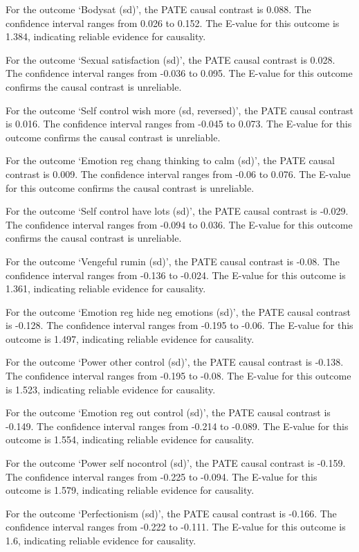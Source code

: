 \documentclass[
  singlecolumn]{report}
\begin{document}
For the outcome `Bodysat (sd)', the PATE causal contrast is 0.088. The
confidence interval ranges from 0.026 to 0.152. The E-value for this
outcome is 1.384, indicating reliable evidence for causality.

For the outcome `Sexual satisfaction (sd)', the PATE causal contrast is
0.028. The confidence interval ranges from -0.036 to 0.095. The E-value
for this outcome confirms the causal contrast is unreliable.

For the outcome `Self control wish more (sd, reversed)', the PATE causal
contrast is 0.016. The confidence interval ranges from -0.045 to 0.073.
The E-value for this outcome confirms the causal contrast is unreliable.

For the outcome `Emotion reg chang thinking to calm (sd)', the PATE
causal contrast is 0.009. The confidence interval ranges from -0.06 to
0.076. The E-value for this outcome confirms the causal contrast is
unreliable.

For the outcome `Self control have lots (sd)', the PATE causal contrast
is -0.029. The confidence interval ranges from -0.094 to 0.036. The
E-value for this outcome confirms the causal contrast is unreliable.

For the outcome `Vengeful rumin (sd)', the PATE causal contrast is
-0.08. The confidence interval ranges from -0.136 to -0.024. The E-value
for this outcome is 1.361, indicating reliable evidence for causality.

For the outcome `Emotion reg hide neg emotions (sd)', the PATE causal
contrast is -0.128. The confidence interval ranges from -0.195 to -0.06.
The E-value for this outcome is 1.497, indicating reliable evidence for
causality.

For the outcome `Power other control (sd)', the PATE causal contrast is
-0.138. The confidence interval ranges from -0.195 to -0.08. The E-value
for this outcome is 1.523, indicating reliable evidence for causality.

For the outcome `Emotion reg out control (sd)', the PATE causal contrast
is -0.149. The confidence interval ranges from -0.214 to -0.089. The
E-value for this outcome is 1.554, indicating reliable evidence for
causality.

For the outcome `Power self nocontrol (sd)', the PATE causal contrast is
-0.159. The confidence interval ranges from -0.225 to -0.094. The
E-value for this outcome is 1.579, indicating reliable evidence for
causality.

For the outcome `Perfectionism (sd)', the PATE causal contrast is
-0.166. The confidence interval ranges from -0.222 to -0.111. The
E-value for this outcome is 1.6, indicating reliable evidence for
causality.
\end{document}
